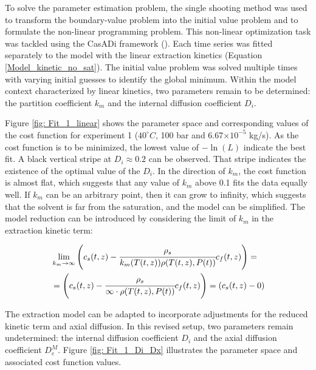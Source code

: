 \documentclass[../Supercritical_fluid_extraction_of_essential_oil_from_chamomile.tex]{subfiles}
\begin{document}
	
	\label{CH: Results}
	
	To solve the parameter estimation problem, the single shooting method was used to transform the boundary-value problem into the initial value problem and to formulate the non-linear programming problem. This non-linear optimization task was tackled using the CasADi framework (\citet{Andersson2018}). Each time series was fitted separately to the model with the linear extraction kinetics (Equation \ref{Model_kinetic_no_sat}). The initial value problem was solved multiple times with varying initial guesses to identify the global minimum. Within the model context characterized by linear kinetics, two parameters remain to be determined: the partition coefficient $k_m$ and the internal diffusion coefficient $D_i$. 
	
	
	
	Figure \ref{fig: Fit_1_linear} shows the parameter space and corresponding values of the cost function for experiment 1 ($40^\circ C$, 100 bar and 6.67$\times 10^{-5}$ kg/s). As the cost function is to be minimized, the lowest value of $-\ln(L)$ indicate the best fit. A black vertical stripe at $D_i \approx 0.2$ can be observed. That stripe indicates the existence of the optimal value of the $D_i$. In the direction of $k_m$, the cost function is almost flat, which suggests that any value of $k_m$ above 0.1 fits the data equally well. If $k_m$ can be an arbitrary point, then it can grow to infinity, which suggests that the solvent is far from the saturation, and the model can be simplified. The model reduction can be introduced by considering the limit of $k_m$ in the extraction kinetic term: 
	
	{\footnotesize
		\begin{equation*}
			\begin{split}
				&\lim_{k_m \rightarrow \infty} \left({\color{black}{\color{black} c_s} }(t,z)  - \cfrac{{\color{black}\rho_s}}{{\color{black}k_m}({\color{black}T}(t,z)){\color{black}\rho}({\color{black}T}(t,z),{\color{black}P}(t))}  {\color{black}c_f}(t,z) \right)  = \\
				&= \left({\color{black}{\color{black} c_s} }(t,z)  - \cfrac{\rho_s}{\infty \cdot \rho(T(t,z),P(t))}  {c_f}(t,z) \right) = \left(c_s(t,z) - 0 \right)
			\end{split}
	\end{equation*} }
	
	The extraction model can be adapted to incorporate adjustments for the reduced kinetic term and axial diffusion. In this revised setup, two parameters remain undetermined: the internal diffusion coefficient $D_i$ and the axial diffusion coefficient $D_e^M$. Figure \ref{fig: Fit_1_Di_Dx} illustrates the parameter space and associated cost function values.
	
\end{document}
